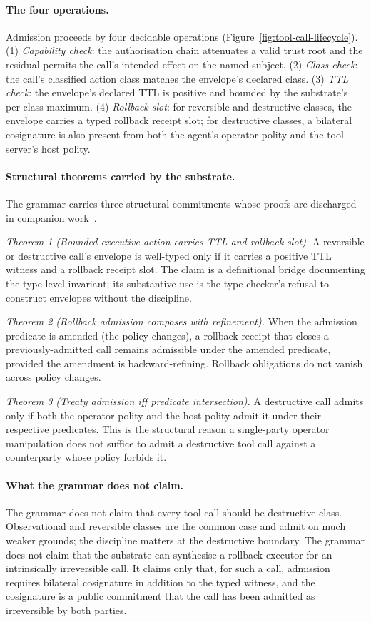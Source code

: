 \paragraph{The four operations.}
Admission proceeds by four decidable operations (Figure~\ref{fig:tool-call-lifecycle}). (1) \emph{Capability check}: the authorisation chain attenuates a valid trust root and the residual permits the call's intended effect on the named subject. (2) \emph{Class check}: the call's classified action class matches the envelope's declared class. (3) \emph{TTL check}: the envelope's declared TTL is positive and bounded by the substrate's per-class maximum. (4) \emph{Rollback slot}: for reversible and destructive classes, the envelope carries a typed rollback receipt slot; for destructive classes, a bilateral cosignature is also present from both the agent's operator polity and the tool server's host polity.

\paragraph{Structural theorems carried by the substrate.}
The grammar carries three structural commitments whose proofs are discharged in companion work~\cite{programmableSovereignty2026}.

\emph{Theorem 1 (Bounded executive action carries TTL and rollback slot).} A reversible or destructive call's envelope is well-typed only if it carries a positive TTL witness and a rollback receipt slot. The claim is a definitional bridge documenting the type-level invariant; its substantive use is the type-checker's refusal to construct envelopes without the discipline.

\emph{Theorem 2 (Rollback admission composes with refinement).} When the admission predicate is amended (the policy changes), a rollback receipt that closes a previously-admitted call remains admissible under the amended predicate, provided the amendment is backward-refining. Rollback obligations do not vanish across policy changes.

\emph{Theorem 3 (Treaty admission iff predicate intersection).} A destructive call admits only if both the operator polity and the host polity admit it under their respective predicates. This is the structural reason a single-party operator manipulation does not suffice to admit a destructive tool call against a counterparty whose policy forbids it.

\paragraph{What the grammar does not claim.}
The grammar does not claim that every tool call should be destructive-class. Observational and reversible classes are the common case and admit on much weaker grounds; the discipline matters at the destructive boundary. The grammar does not claim that the substrate can synthesise a rollback executor for an intrinsically irreversible call. It claims only that, for such a call, admission requires bilateral cosignature in addition to the typed witness, and the cosignature is a public commitment that the call has been admitted as irreversible by both parties.

